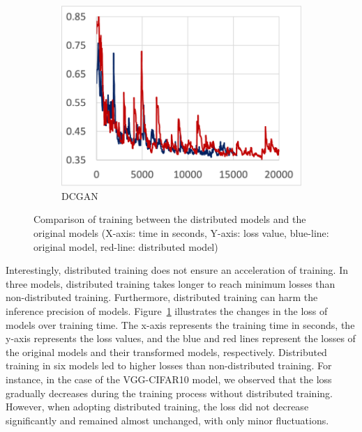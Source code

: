 \begin{figure}
\begin{subfigure}[t]{.24\textwidth}
    \includegraphics[width=\textwidth]{tf2-13}
    \caption{DCGAN}
  \end{subfigure} 

  \caption{Comparison of training between the distributed models and the
  original models (X-axis: time in seconds, Y-axis: loss value, blue-line:
  original model, red-line: distributed model)}
  \label{fig:eval:train}
\end{figure}

Interestingly, distributed training does not ensure an acceleration of
training.
In three models, distributed training takes longer to reach
minimum losses than non-distributed training.
Furthermore, distributed training can harm the inference precision of models.
Figure~\ref{fig:eval:train} illustrates the changes in the loss of models over
training time. 
The x-axis represents the training time in seconds, the y-axis represents the
loss values, and the blue and red lines represent the losses of the
original models and their transformed models, respectively.
Distributed training in six models led to higher losses than
non-distributed training.
For instance, in the case of the VGG-CIFAR10 model, we observed that the loss
gradually decreases during the training process without distributed training.
However, when adopting distributed training, the loss did not decrease
significantly and remained almost unchanged, with only minor fluctuations.

